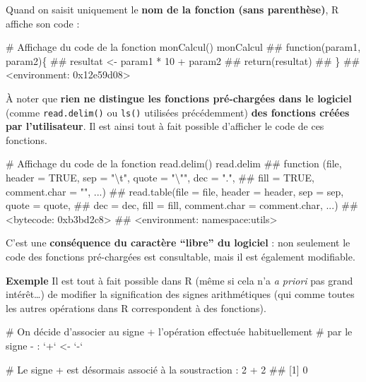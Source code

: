 \documentclass[12pt,twosided, notitlepage]{book}
\newenvironment{Shaded}{}{}
\newcommand{\DataTypeTok}[1]{#1}
\newcommand{\DecValTok}[1]{#1}
\newcommand{\StringTok}[1]{\textcolor[rgb]{0.00,0.50,0.50}{#1}}
\newcommand{\CommentTok}[1]{\textcolor[rgb]{0.00,0.50,0.00}{#1}}
\newcommand{\OperatorTok}[1]{#1}
\newcommand{\NormalTok}[1]{#1}
\renewenvironment{Shaded}{\begin{snugshade}}{\end{snugshade}}
\begin{document}
Quand on saisit uniquement le \textbf{nom de la fonction (sans
parenthèse)}, R affiche son code :

\begin{Shaded}
\begin{Highlighting}[]
\CommentTok{# Affichage du code de la fonction monCalcul()}
\NormalTok{monCalcul}
\NormalTok{  ## function(param1, param2)\{}
\NormalTok{  ##   resultat <- param1 * 10 + param2}
\NormalTok{  ##   return(resultat)}
\NormalTok{  ## \}}
\NormalTok{  ## <environment: 0x12e59d08>}
\end{Highlighting}
\end{Shaded}

À noter que \textbf{rien ne distingue les fonctions pré-chargées dans le
logiciel} (comme \texttt{read.delim()} ou \texttt{ls()} utilisées
précédemment) \textbf{des fonctions créées par l'utilisateur}. Il est
ainsi tout à fait possible d'afficher le code de ces
fonctions.

\begin{Shaded}
\begin{Highlighting}[]
\CommentTok{# Affichage du code de la fonction read.delim()}
\NormalTok{read.delim}
\NormalTok{  ## function (file, header = TRUE, sep = "\textbackslash{}t", quote = "\textbackslash{}"", dec = ".", }
\NormalTok{  ##     fill = TRUE, comment.char = "", ...) }
\NormalTok{  ## read.table(file = file, header = header, sep = sep, quote = quote, }
\NormalTok{  ##     dec = dec, fill = fill, comment.char = comment.char, ...)}
\NormalTok{  ## <bytecode: 0xb3bd2c8>}
\NormalTok{  ## <environment: namespace:utils>}
\end{Highlighting}
\end{Shaded}

C'est une \textbf{conséquence du caractère \enquote{libre} du logiciel}
: non seulement le code des fonctions pré-chargées est consultable, mais
il est également modifiable.

\textbf{Exemple} Il est tout à fait possible dans R (même si cela n'a
\emph{a priori} pas grand intérêt\ldots{}) de modifier la signification
des signes arithmétiques (qui comme toutes les autres opérations dans R
correspondent à des fonctions).

\begin{Shaded}
\begin{Highlighting}[]
\CommentTok{# On décide d'associer au signe + l'opération effectuée habituellement }
\CommentTok{# par le signe - :}
\StringTok{`}\DataTypeTok{+}\StringTok{`}\NormalTok{ <-}\StringTok{ `}\DataTypeTok{-}\StringTok{`}

\CommentTok{# Le signe + est désormais associé à la soustraction :}
\DecValTok{2} \OperatorTok{+}\StringTok{ }\DecValTok{2}
\NormalTok{  ## [1] 0}
\end{Highlighting}
\end{Shaded}
\end{document}
